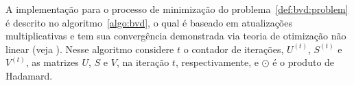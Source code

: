 \documentclass[
    12pt,                %
    oneside,            %
    a4paper,            %
    english,            %
    brazil                %
    ]{abntex2ppgsi}
\begin{document}
%
%
%
%

A implementação para o processo de minimização do problema~\ref{def:bvd:problem} é descrito no algoritmo~\ref{algo:bvd}, o qual é baseado em atualizações multiplicativas e tem sua convergência demonstrada via teoria de otimização não linear (veja \cite{Long2005}).
Nesse algoritmo considere $t$ o contador de iterações, $U^{(t)}$, $S^{(t)}$ e $V^{(t)}$, as matrizes $U$, $S$ e $V$, na iteração $t$, respectivamente, e $\odot$ é o produto de Hadamard.

\end{document}
